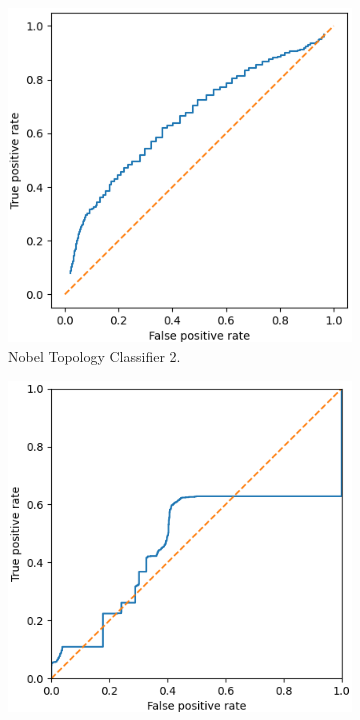 \begin{figure}[H]
    \centering
    \begin{subfigure}[H]{0.475\textwidth}
        \includegraphics[width=\textwidth]{figs/results/metric_normilisation/nobel-germany_ac2.png}
        \caption{Nobel Topology Classifier 2.}
    \end{subfigure}
    \begin{subfigure}[H]{0.475\textwidth}
        \includegraphics[width=\textwidth]{figs/results/metric_normilisation/nobel-germany_ac3.png}

\end{subfigure}
\end{figure}
